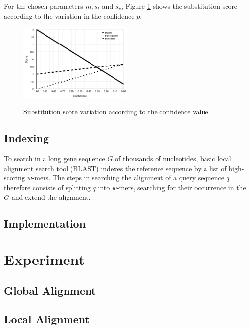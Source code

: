 \documentclass{article}
\begin{document}
For the chosen parameters $m, s_t$ and $s_v$, Figure \ref{figure:score_graphs} shows the substitution score according to the variation in the confidence $p$. 

\begin{figure}
\begin{center}
\caption{Substitution score variation according to the confidence value.}
   \includegraphics[width=0.5\textwidth]{score_graph}
\label{figure:score_graphs}
\end{center}
\end{figure}

\subsection{Indexing}

To search in a long gene sequence $G$ of thousands of nucleotides, basic local alignment search tool (BLAST) indexes the reference sequence by a list of high-scoring $w$-mers. The steps in searching the alignment of a query sequence $q$ therefore consists of splitting $q$ into $w$-mers, searching for their occurrence in the $G$ and extend the alignment. 

\subsection{Implementation}

\section{Experiment}
\subsection{Global Alignment}

\subsection{Local Alignment}
\end{document}
